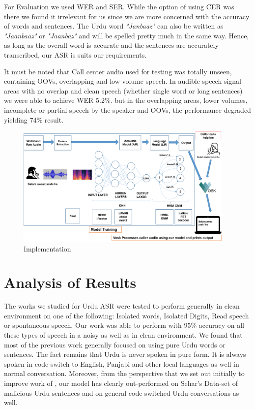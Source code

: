 \documentclass[a4paper, 11pt]{article}
\begin{document}
For Evaluation we used WER and SER. While the option of using CER was there we found it irrelevant for us since we are more concerned with the accuracy of words and sentences. The Urdu word \textit{"Janbaaz"} can also be written as \textit{"Jaanbaaz"} or \textit{"Jaanbaz"} and will be spelled pretty much in the same way. Hence, as long as the overall word is accurate and the sentences are accurately transcribed, our ASR is suits our requirements.

It must be noted that Call center audio used for testing was totally unseen, containing OOVs, overlapping and low-volume speech. In audible speech signal areas with no overlap and clean speech (whether single word or long sentences) we were able to achieve WER 5.2\%. but in the overlapping areas, lower volumes, incomplete or partial speech by the speaker and OOVs, the performance degraded yielding 74\% result. 

\begin{figure}[htbp]
    \includegraphics[width=0.95\textwidth]{img/Implement2.png}
    \caption{Implementation}
    \label{fig:implementation-architecture}
\end{figure}

\section{Analysis of Results}
\label{se:discussion}

The works we studied for Urdu ASR were tested to perform generally in clean environment on one of the following: Isolated words, Isolated Digits, Read speech or spontaneous speech. Our work was able to perform with 95\% accuracy on all these types of speech in a noisy as well as in clean environment. We found that most of the previous work generally focused on using pure Urdu words or sentences. The fact remains that Urdu is never spoken in pure form. It is always spoken in code-switch to English, Panjabi and other local languages as well in normal conversation. Moreover, from the perspective that we set out initially to improve work of \cite{sehar_gul_detecting_2020}, our model has clearly out-performed on Sehar's Data-set of malicious Urdu sentences and on general code-switched Urdu conversations as well. 
\end{document}

